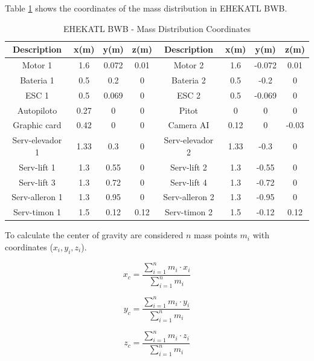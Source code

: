 Table \ref{Coordendas de distribución de masas} shows the coordinates of the mass distribution in EHEKATL BWB. 
\begin{table}[!h]
    \centering
    \caption{ EHEKATL BWB - Mass Distribution Coordinates}
    \begin{tabular}{|c|c|c|c||c|c|c|c|}
    \hline
    \textbf{Description} & \textbf{x(m)} & \textbf{y(m)} & \textbf{z(m)} & \textbf{Description} & \textbf{x(m)} & \textbf{y(m)} & \textbf{z(m)} \\
    \hline
    Motor 1 & 1.6 & 0.072 & 0.01 & Motor 2 & 1.6 & -0.072 & 0.01 \\
    Bateria 1 & 0.5 & 0.2 & 0 & Bateria 2 & 0.5 & -0.2 & 0 \\
    ESC 1 & 0.5 & 0.069 & 0 & ESC 2 & 0.5 & -0.069 & 0 \\
    Autopiloto & 0.27 & 0 & 0 & Pitot & 0 & 0 & 0 \\
    Graphic card & 0.42 & 0 & 0 & Camera AI &  0.12 & 0 & -0.03  \\
    Serv-elevador 1 & 1.33  & 0.3 & 0 & Serv-elevador 2 & 1.33 & -0.3 & 0\\
    Serv-lift 1 & 1.3 & 0.55 & 0 & Serv-lift 2 & 1.3 & -0.55 & 0\\
    Serv-lift 3 & 1.3 & 0.72 & 0 & Serv-lift 4 & 1.3 & -0.72 & 0\\
    Serv-alleron 1 & 1.3 & 0.95 & 0 & Serv-alleron 2 & 1.3 & -0.95 & 0\\
    Serv-timon 1 & 1.5 & 0.12 & 0.12 & Serv-timon 2 & 1.5 & -0.12 & 0.12\\
    \hline
    \end{tabular}
    \label{Coordendas de distribución de masas}
\end{table}

To calculate the center of gravity are considered $n$ mass points $m_i$ with coordinates ($x_i, y_i, z_i$).  

\begin{equation}
   x_{c} = \frac{\sum_{i=1}^{n} m_i \cdot x_i}{\sum_{i=1}^{n} m_i} 
\end{equation}

\begin{equation}
    y_{c} = \frac{\sum_{i=1}^{n} m_i \cdot y_i}{\sum_{i=1}^{n} m_i}
\end{equation}

\begin{equation}
   z_{c} = \frac{\sum_{i=1}^{n} m_i \cdot z_i}{\sum_{i=1}^{n} m_i} 
\end{equation}

